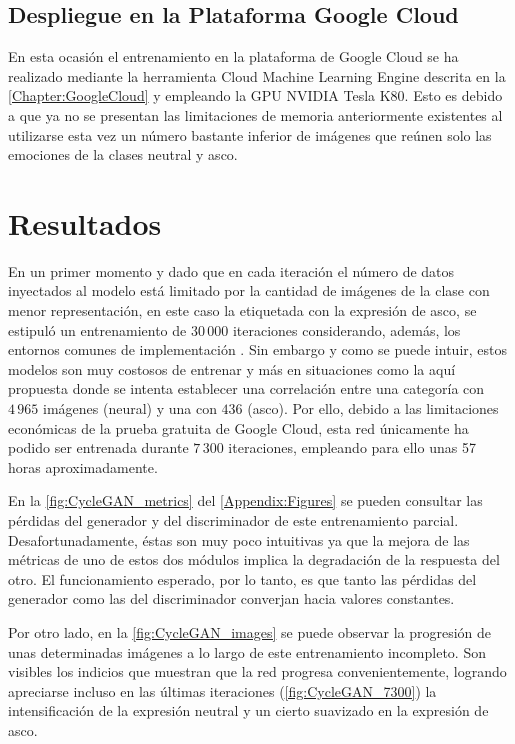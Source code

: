 \subsection{Despliegue en la Plataforma Google Cloud}

En esta ocasión el entrenamiento en la plataforma de Google Cloud se ha realizado mediante la herramienta Cloud Machine Learning Engine descrita en la \autoref{Chapter:GoogleCloud} y empleando la GPU NVIDIA Tesla K80. Esto es debido a que ya no se presentan las limitaciones de memoria anteriormente existentes al utilizarse esta vez un número bastante inferior de imágenes que reúnen solo las emociones de la clases neutral y asco.

\section{Resultados}

En un primer momento y dado que en cada iteración el número de datos inyectados al modelo está limitado por la cantidad de imágenes de la clase con menor representación, en este caso la etiquetada con la expresión de asco, se estipuló un entrenamiento de $30\,000$ iteraciones considerando, además, los entornos comunes de implementación \cite{RSGAN}. Sin embargo y como se puede intuir, estos modelos son muy costosos de entrenar y más en situaciones como la aquí propuesta donde se intenta establecer una correlación entre una categoría con $4\,965$ imágenes (neural) y una con $436$ (asco). Por ello, debido a las limitaciones económicas de la prueba gratuita de Google Cloud, esta red únicamente ha podido ser entrenada durante $7\,300$ iteraciones, empleando para ello unas 57 horas aproximadamente.

En la \autoref{fig:CycleGAN_metrics} del \autoref{Appendix:Figures} se pueden consultar las pérdidas del generador y del discriminador de este entrenamiento parcial. Desafortunadamente, éstas son muy poco intuitivas ya que la mejora de las métricas de uno de estos dos módulos implica la degradación de la respuesta del otro. El funcionamiento esperado, por lo tanto, es que tanto las pérdidas del generador como las del discriminador converjan hacia valores constantes.

Por otro lado, en la \autoref{fig:CycleGAN_images} se puede observar la progresión de unas determinadas imágenes a lo largo de este entrenamiento incompleto. Son visibles los indicios que muestran que la red progresa convenientemente, logrando apreciarse incluso en las últimas iteraciones (\autoref{fig:CycleGAN_7300}) la intensificación de la expresión neutral y un cierto suavizado en la expresión de asco.

